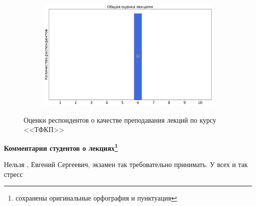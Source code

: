 \begin{figure}[H]
\begin{subfigure}[b]{0.45\textwidth}
            \end{subfigure}	
            \begin{subfigure}[b]{0.45\textwidth}
                \centering
                \includegraphics[width=\textwidth]{images/3 course/ТФКП/lecturer-marks-Половинкин Е.С.-3.png}
            \end{subfigure}
            \caption{Оценки респондентов о качестве преподавания лекций по курсу <<ТФКП>>}
        \end{figure}

        \textbf{Комментарии студентов о лекциях\protect\footnote{сохранены оригинальные орфография и пунктуация}}
            \begin{commentbox} 
                Нельзя , Евгений Сергеевич, экзамен так требовательно принимать. У всех и так стресс 
            \end{commentbox} 

    

